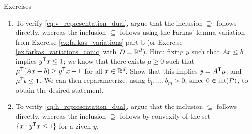 \begin{xcb}{Exercises}
\begin{enumerate}[label=\thechapter.\arabic*]
\begin{enumerate}[label=\alph*.]
\item Prove that the second statement implies the first.

\item To prove that the first statement implies the second, start by defining 
  \[
  K_1 = \closure \Big\{ (x,t) \in \R^d \times \R: t > 0, \, x/t \in D \Big\}
  \quad \text{and} \quad K_2 = \Big\{ (x,t) \in \R^d \times \R: Ax \leq tb
  \Big\}.  
  \]
  Show that these are closed convex cones, with $\interior(K_1) \cap K_2 \not= 
  \emptyset$. 

\item Define $f = (g,-h) \in \R^{d+1}$, and show that $f^\T (x,t) \leq 0$ for
  all $(x,t) \in K_1 \cap K_2$.  

\item Use Exercise \ref{ex:dubovitski_milutin_lemma} part c to argue that we can
  write $f = \psi + \phi$, where $\psi^\T(x,t) \leq 0$ for all $x \in K_1$, and
  $\phi^\T (x,t) \leq 0$ for all $x \in K_2$. 

\item Use Exercise \ref{ex:farkas_variations} part a to argue that there exists
  $\mu \geq 0$ with $[A \, -b]^\T \mu = \phi$, in other words, $\phi^\T (x,t) =
  \mu^\T (Ax - tb)$ for all $x,t$. Use this to prove the desired result.        
\end{enumerate}
  
\item \label{ex:v_representation_dual}
  To verify \eqref{eq:v_representation_dual}, argue that the inclusion
  $\supseteq$ follows directly, whereas the inclusion $\subseteq$ follows using
  the Farkas' lemma variation from Exercise \ref{ex:farkas_variations} part b
  (or Exercise \ref{ex:farkas_variations_conic} with $D = \mathbb{R}^d$). Hint: fixing
  $y$ such that $Ax \leq b$ implies $y^{\mathsf{T}} x \leq 1$; we know that there exists  
  $\mu \geq 0$ such that $\mu^{\mathsf{T}} (Ax - b) \geq y^{\mathsf{T}} x - 1$ for all $x \in 
  \mathbb{R}^d$. Show that this implies $y = A^{\mathsf{T}} \mu$, and $\mu^{\mathsf{T}} b \leq 1$.
  We can then reparametrize, using $b_1,\dots,b_m > 0$, since $0 \in
  \operatorname{int}(P)$, to obtain the desired statement. 

\item \label{ex:h_representation_dual}
  To verify \eqref{eq:h_representation_dual}, argue that the inclusion
  $\subseteq$ follows directly, whereas the inclusion $\supseteq$ follows
  by convexity of the set $\{x : y^{\mathsf{T}} x \leq 1\}$ for a given $y$.


\end{enumerate}
\end{xcb}

